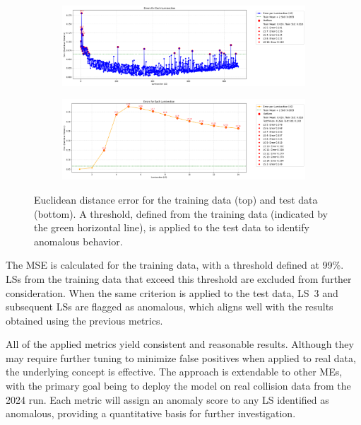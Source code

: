 \begin{figure}[H]
    \centering
    \begin{subfigure}[t]{1\textwidth}
        \centering
        \includegraphics[width=\textwidth]{images/euclid_train.png}
    \end{subfigure}
    \hfill
    \begin{subfigure}[t]{1\textwidth}
        \centering
        \includegraphics[width=\textwidth]{images/euclid_test_fake.png}
    \end{subfigure}
    \caption{Euclidean distance error for the training data (top) and test data (bottom). A threshold, defined from the training data (indicated by the green horizontal line), is applied to the test data to identify anomalous behavior.}
    \label{fig:euc_distance}
\end{figure}

The MSE is calculated for the training data, with a threshold defined at 99\%. LSs from the training data that exceed this threshold are excluded from further consideration. When the same criterion is applied to the test data, LS~3 and subsequent LSs are flagged as anomalous, which aligns well with the results obtained using the previous metrics.

All of the applied metrics yield consistent and reasonable results. Although they may require further tuning to minimize false positives when applied to real data, the underlying concept is effective. The approach is extendable to other MEs, with the primary goal being to deploy the model on real collision data from the 2024 run. Each metric will assign an anomaly score to any LS identified as anomalous, providing a quantitative basis for further investigation.

